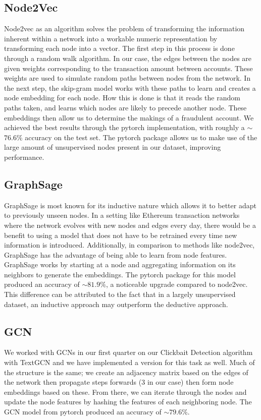 \documentclass{article}
\begin{document}
\subsection{Node2Vec}
	Node2vec as an algorithm solves the problem of transforming the information inherent within a network into a workable numeric representation by transforming each node into a vector. The first step in this process is done through a random walk algorithm. In our case, the edges between the nodes are given weights corresponding to the transaction amount between accounts. These weights are used to simulate random paths between nodes from the network. In the next step, the skip-gram model works with these paths to learn and creates a node embedding for each node. How this is done is that it reads the random paths taken, and learns which nodes are likely to precede another node. These embeddings then allow us to determine the makings of a fraudulent account. We achieved the best results through the pytorch implementation, with roughly a $\sim$$76.6\%$  accuracy on the test set. The pytorch package allows us to make use of the large amount of unsupervised nodes present in our dataset, improving performance.


\subsection{GraphSage}

	GraphSage is most known for its inductive nature which allows it to better adapt to previously unseen nodes. In a setting like Ethereum transaction networks where the network evolves with new nodes and edges every day, there would be a benefit to using a model that does not have to be retrained every time new information is introduced. Additionally, in comparison to methods like node2vec, GraphSage has the advantage of being able to learn from node features. GraphSage works by starting at a node and aggregating information on its neighbors to generate the embeddings. The pytorch package for this model produced an accuracy of $\sim$$81.9\%$, a noticeable upgrade compared to node2vec. This difference can be attributed to the fact that in a largely unsupervised dataset, an inductive approach may outperform the deductive approach.


\subsection{GCN}
	We worked with GCNs in our first quarter on our Clickbait Detection algorithm with TextGCN and we have implemented a version for this task as well. Much of the structure is the same; we create an adjacency matrix based on the edges of the network then propagate steps forwards (3 in our case) then form node embeddings based on these. From there, we can iterate through the nodes and update the node features by hashing the features of each neighboring node. The GCN model from pytorch produced an accuracy of $\sim$$79.6\%$.
\end{document}
